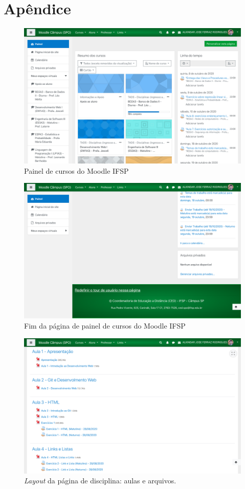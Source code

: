 \documentclass[11pt]{article}
\begin{document}
\section*{Apêndice}
\label{sec:orgbcb1147}
\setcounter{figure}{0}
\renewcommand{\figurename}{Fig.}
\begin{figure}[htbp]
\centering
\includegraphics[width=.9\linewidth]{./media/painel.png}
\caption{\label{fig:org6c39f2d}Painel de cursos do Moodle IFSP}
\end{figure}
\begin{figure}[htbp]
\centering
\includegraphics[width=.9\linewidth]{./media/painel_fim.png}
\caption{\label{fig:orga96bba0}Fim da página de painel de cursos do Moodle IFSP}
\end{figure}
\begin{figure}[htbp]
\centering
\includegraphics[width=.9\linewidth]{./media/disc_1.png}
\caption[\emph{Layout}]{\label{fig:orgef731fb}\emph{Layout} da página de disciplina: aulas e arquivos.}
\end{figure}
\end{document}
